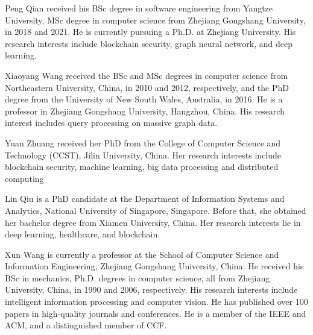 \vspace{-4em}
\begin{IEEEbiography}{Peng Qian}
received his BSc degree in software engineering from Yangtze University, MSc degree in computer science from Zhejiang Gongshang University, in 2018 and 2021. He is currently pursuing a Ph.D. at Zhejiang University. His research interests include blockchain security, graph neural network, and deep learning.
\end{IEEEbiography}

\vspace{-4em}
\begin{IEEEbiography}{Xiaoyang Wang}
received the BSc and MSc degrees in computer science from Northeastern University, China, in 2010 and 2012, respectively, and the PhD degree from the University of New South Wales, Australia, in 2016. He is a professor in Zhejiang Gongshang University, Hangzhou, China. His research interest includes query processing on massive graph data.
\end{IEEEbiography}

\vspace{-4em}
\begin{IEEEbiography}{Yuan Zhuang}
received her PhD from the College of Computer Science and Technology (CCST), Jilin University, China. Her research interests include blockchain security, machine learning, big data processing and distributed computing
\end{IEEEbiography}

\vspace{-4em}
\begin{IEEEbiography}{Lin Qiu}
 is a PhD candidate at the Department
of Information Systems and Analytics, National University of Singapore, Singapore. Before
that, she obtained her bachelor degree from Xiamen University, China. Her research interests lie in deep learning, healthcare, and blockchain.
\end{IEEEbiography}

\vspace{-4em}
\begin{IEEEbiography}{Xun Wang}
is currently a professor at the School of Computer Science and Information Engineering, Zhejiang Gongshang University, China. He received his BSc in mechanics, Ph.D. degrees in computer science, all from Zhejiang University, China, in 1990 and 2006, respectively. His  research interests include intelligent information processing  and computer vision. He has published over 100 papers in high-quality journals and conferences. He is a member of the IEEE and ACM, and a distinguished member of CCF.
\end{IEEEbiography}

\iffalse
\begin{IEEEbiographynophoto}{Jane Doe}
Biography text here.
\end{IEEEbiographynophoto}
\fi

\fi

